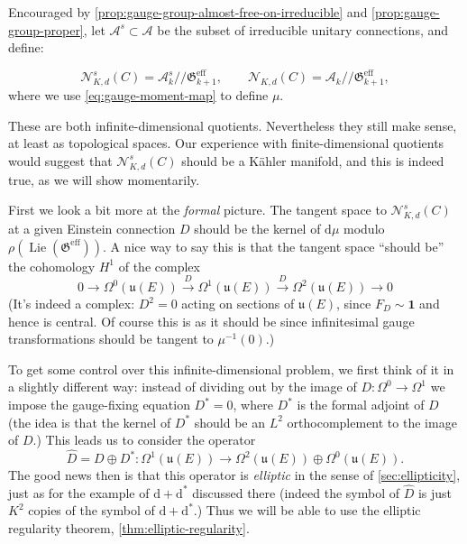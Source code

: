 \documentclass[12pt,letterpaper,reqno]{article}
\numberwithin{equation}{section}
\newcommand{\fu}{{\mathfrak u}}
\newcommand{\fG}{{\mathfrak G}}
\newcommand{\cN}{\ensuremath{\mathcal N}}
\newcommand{\cA}{\ensuremath{\mathcal A}}
\newcommand{\kahler}{K\"ahler\xspace}
\newcommand{\kq}{/\!\!/}
\newcommand\bid{{\mathbf 1}}
\newcommand{\de}{\mathrm{d}}
\newcommand{\eff}{\mathrm{eff}}
\newcommand{\ti}[1]{\textit{#1}}
\DeclareMathOperator{\Lie}{Lie}
\begin{document}
Encouraged by \autoref{prop:gauge-group-almost-free-on-irreducible}
and \autoref{prop:gauge-group-proper}, let $\cA^s \subset \cA$ be the
subset of irreducible unitary connections, and define:

\begin{defn}
\begin{equation}
  \cN^s_{K,d}(C) = \cA^s_k \kq \fG^\eff_{k+1}, \qquad \cN_{K,d}(C) = \cA_k \kq \fG^\eff_{k+1},
\end{equation}
where we use \eqref{eq:gauge-moment-map} to define $\mu$.
\end{defn}

These are both infinite-dimensional quotients.
Nevertheless they still make sense, at least
as topological spaces. Our experience with finite-dimensional
quotients would suggest that $\cN^s_{K,d}(C)$ should be a \kahler
manifold, and this is indeed true, as we will show momentarily.

First we look a bit more at the \ti{formal} picture.
The tangent space to $\cN_{K,d}^s(C)$
at a given Einstein connection $D$ should be the kernel of $\de \mu$
modulo $\rho(\Lie (\fG^\eff))$. A nice way to say this is that
the tangent space ``should be'' the cohomology $H^1$ of the complex
\begin{equation} \label{eq:gauge-complex}
  0 \to \Omega^0(\fu(E)) \xrightarrow{D} \Omega^1(\fu(E)) \xrightarrow{D} \Omega^2(\fu(E)) \to 0
\end{equation}
(It's indeed a complex: $D^2 = 0$ acting
on sections of $\fu(E)$, since $F_D \sim \bid$ and hence
is central. Of course this is as it should be since infinitesimal
gauge transformations should be tangent to $\mu^{-1}(0)$.)

To get some control over this infinite-dimensional
problem, we first think of it in a slightly different way:
instead of dividing out by the image of $D: \Omega^0 \to \Omega^1$
we impose the gauge-fixing equation $D^* = 0$, where $D^*$ is the
formal adjoint of $D$
(the idea is that the kernel of $D^*$ should be an $L^2$
orthocomplement to the image of $D$.)
This leads us to consider the operator
\begin{equation}
 \hat{D} = D \oplus D^*: \Omega^1(\fu(E)) \to \Omega^2(\fu(E)) \oplus \Omega^0(\fu(E)).
\end{equation}
The good news then is that this operator is \ti{elliptic} in the sense of
\autoref{sec:ellipticity},
just as for the example of $\de + \de^*$ discussed there
(indeed the symbol of $\hat D$ is just $K^2$ copies of the symbol
of $\de + \de^*$.)
Thus we will be able to use the elliptic regularity
theorem, \autoref{thm:elliptic-regularity}.
\end{document}

